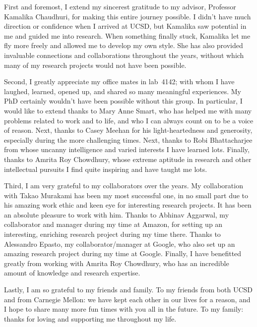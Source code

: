 \documentclass[12pt]{ucsddissertation}
\begin{document}
\begin{acknowledgements}
First and foremost, I extend my sincerest gratitude to my advisor,
Professor Kamalika Chaudhuri, for making this entire journey possible.
I didn't have much direction or confidence when I arrived at UCSD,
but Kamalika saw potential in me and guided me into research. When 
something finally stuck, Kamalika let me fly more freely and allowed me
to develop my own style. She has also provided invaluable connections and
collaborations throughout the years, without which many of my research 
projects would not have been possible.

Second, I greatly appreciate my office mates 
in lab~4142; with whom I have laughed, learned, opened up, and shared
so many meaningful experiences. My PhD certainly wouldn't have been possible without 
this group. In particular, I would like to extend thanks to
Mary Anne Smart, who has helped me with many problems related to work and to 
life, and who I can always count on to be a voice of reason. Next,
thanks to Casey Meehan for his light-heartedness and generosity,
especially during the more challenging times. Next, 
thanks to Robi Bhattacharjee from whose uncanny intelligence and varied interests
I have learned lots. Finally, thanks to Amrita Roy Chowdhury, whose
extreme aptitude in research and other intellectual pursuits I find quite
inspiring and have taught me lots.

Third, I am very grateful to my collaborators over the years. My collaboration
with Takao Murakami has been my most successful one, in no small part due to 
his amazing work ethic and keen eye for interesting research projects. It has
been an absolute pleasure to work with him. Thanks to Abhinav Aggarwal, my
collaborator and manager during my time at Amazon, for setting up an interesting,
enriching research project during my time there. Thanks to Alessandro Epasto, my 
collaborator/manager at Google, who also set up an amazing research project during my
time at Google. Finally, I have benefitted greatly from working with 
Amrita Roy Chowdhury, who has an incredible amount of knowledge and research 
expertise.

Lastly, I am so grateful to my friends and family. To my friends 
from both UCSD and from Carnegie
Mellon: we have kept each other in our lives for a reason, and I hope
to share many more fun times with you all in the future. To my family: thanks
for loving and supporting me throughout my life.



\end{acknowledgements}
\end{document}
